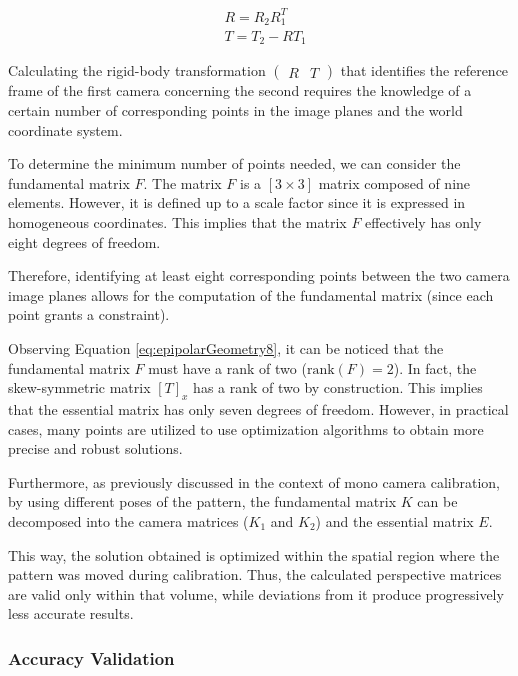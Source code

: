 \begin{equation}
  \label{eq:stereoCalib2}
  \begin{aligned}
    &R = R_2 R_1^T \\ 
    &T = T_2 - R T_1
  \end{aligned}
\end{equation}


Calculating the rigid-body transformation $\begin{pmatrix} R & T \end{pmatrix}$ that identifies the reference frame of the first camera concerning the second requires the knowledge of a certain number of corresponding points in the image planes and the world coordinate system.

To determine the minimum number of points needed, we can consider the fundamental matrix $F$. The matrix $F$ is a $[3 \times 3]$ matrix composed of nine elements. However, it is defined up to a scale factor since it is expressed in homogeneous coordinates. This implies that the matrix $F$ effectively has only eight degrees of freedom.

Therefore, identifying at least eight corresponding points between the two camera image planes allows for the computation of the fundamental matrix (since each point grants a constraint).

Observing Equation \ref{eq:epipolarGeometry8}, it can be noticed that the fundamental matrix $F$ must have a rank of two ($\text{rank}(F) = 2$). In fact, the skew-symmetric matrix $[T]_x$ has a rank of two by construction.
This implies that the essential matrix has only seven degrees of freedom.
However, in practical cases, many points are utilized to use optimization algorithms to obtain more precise and robust solutions.

Furthermore, as previously discussed in the context of mono camera calibration, by using different poses of the pattern, the fundamental matrix $K$ can be decomposed into the camera matrices ($K_1$ and $K_2$) and the essential matrix $E$.

This way,  the solution obtained is optimized within the spatial region where the pattern was moved during calibration.
Thus, the calculated perspective matrices are valid only within that volume, while deviations from it produce progressively less accurate results.

\subsubsection{Accuracy Validation}


